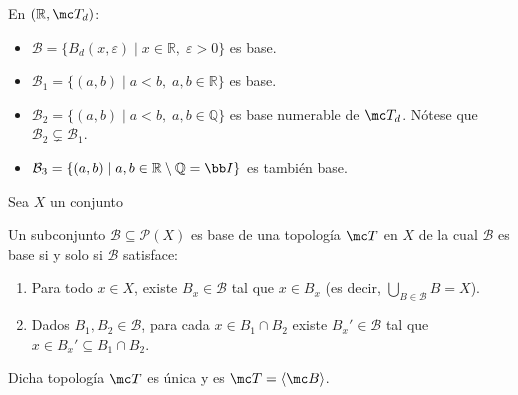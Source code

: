 \begin{center}
\end{center}

\begin{ejem}
En \((\mathbb{R}, \mc T_d)\):
\begin{itemize}
    \item \(\mathcal{B} = \{B_d(x, \varepsilon) \mid x \in \mathbb{R}, \; \varepsilon > 0\}\) es base.
    \item \(\mathcal{B}_1 = \{(a, b) \mid a < b, \; a, b \in \mathbb{R}\}\) es base.
    \item \(\mathcal{B}_2 = \{(a, b) \mid a < b, \; a, b \in \mathbb{Q}\}\) es base numerable de \(\mc T_d\). Nótese que \(\mathcal{B}_2 \subsetneq \mathcal{B}_1\).
    \item \(\mathcal{B}_3 = \{(a, b) \mid a, b \in \mathbb{R} \setminus \mathbb{Q} = \bb I \}\) es también base.
\end{itemize}
\end{ejem}
Sea $X$ un conjunto
\begin{teo}
Un subconjunto \(\mathcal{B} \subseteq \mathcal{P}(X)\) es base de una topología \(\mc T\) en \(X\) de la cual \(\mathcal{B}\) es base si y solo si \(\mathcal{B}\) satisface:
\begin{enumerate}
    \item[\textbf{1)}] Para todo \(x \in X\), existe \(B_x \in \mathcal{B}\) tal que \(x \in B_x\) (es decir, \(\bigcup_{B \in \mathcal{B}} B = X\)).
    \item[\textbf{2)}] Dados \(B_1, B_2 \in \mathcal{B}\), para cada \(x \in B_1 \cap B_2\) existe \(B_x' \in \mathcal{B}\) tal que \(x \in B_x' \subseteq B_1 \cap B_2\).
\end{enumerate}
Dicha topología \(\mc T\) es única y es $\mc T = \langle \mc B \rangle$.
\end{teo}

